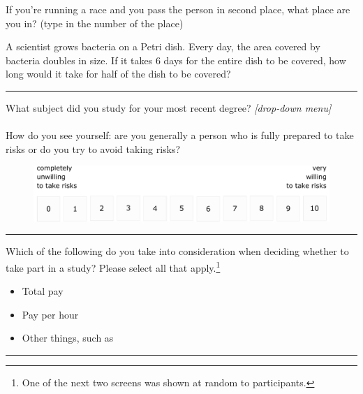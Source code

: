 \documentclass[pdftex,12pt, a4paper]{article}
\begin{document}
\noindent If you're running a race and you pass the person in second place, what place are you in? (type in the number of the place)\\
\framebox[0.1\textwidth]{\rule{0pt}{15pt}}

\noindent A scientist grows bacteria on a Petri dish.
Every day, the area covered by bacteria doubles in size.
If it takes 6 days for the entire dish to be covered, how long would it take for half of the dish to be covered?\\
\framebox[0.1\textwidth]{\rule{0pt}{15pt}}

\bigskip
\noindent \rule{\linewidth}{0.4pt}

\noindent What subject did you study for your most recent degree? \textit{[drop-down menu]}\\
\\
\noindent How do you see yourself: are you generally a person who is fully prepared to take risks or do you try to avoid taking risks?
\begin{figure}[h!]
	\centering
	{\includegraphics[width=\linewidth]{Fig11_RiskAversion.pdf}}
\end{figure}

\bigskip
\noindent \rule{\linewidth}{0.4pt}

\noindent Which of the following do you take into consideration when deciding whether to take part in a study?
Please select all that apply.\footnote{
One of the next two screens was shown at random to participants.
}
\begin{itemize}
\item Total pay
\item Pay per hour
\item Other things, such as \\
\framebox[\textwidth]{\rule{0pt}{15pt}}
\end{itemize}

\bigskip
\noindent \rule{\linewidth}{0.4pt}
\end{document}
